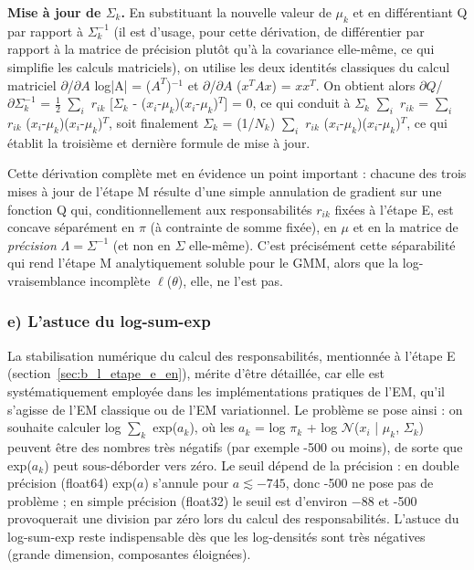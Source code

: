\textbf{Mise à jour de $\Sigma _{k}$. }En substituant la nouvelle valeur de $\mu _{k}$ et en différentiant Q par rapport à $\Sigma _{k}^{-1}$ (il est d'usage, pour cette dérivation, de différentier par rapport à la matrice de précision plutôt qu'à la covariance elle-même, ce qui simplifie les calculs matriciels), on utilise les deux identités classiques du calcul matriciel $\partial $/$\partial A$ log|A| = ($A^{T}$)$^{-1}$ et $\partial $/$\partial A$ ($x^{T}Ax$) = $xx^{T}$. On obtient alors $\partial Q$/$\partial \Sigma _{k}^{-1}$ = $\tfrac{1}{2}$ $\sum_{i}$ $r_{ik}$ [$\Sigma _{k}$ - ($x_{i}$-$\mu _{k}$)($x_{i}$-$\mu _{k}$)$^{T}$] = 0, ce qui conduit à $\Sigma _{k}$ $\sum_{i}$ $r_{ik}$ = $\sum_{i}$ $r_{ik}$ ($x_{i}$-$\mu _{k}$)($x_{i}$-$\mu _{k}$)$^{T}$, soit finalement $\Sigma _{k}$ = (1/$N_{k}$) $\sum_{i}$ $r_{ik}$ ($x_{i}$-$\mu _{k}$)($x_{i}$-$\mu _{k}$)$^{T}$, ce qui établit la troisième et dernière formule de mise à jour.

Cette dérivation complète met en évidence un point important : chacune des trois mises à jour de l'étape M résulte d'une simple annulation de gradient sur une fonction Q qui, conditionnellement aux responsabilités $r_{ik}$ fixées à l'étape E, est concave séparément en $\pi$ (à contrainte de somme fixée), en $\mu$ et en la matrice de \emph{précision} $\Lambda = \Sigma^{-1}$ (et non en $\Sigma$ elle-même). C'est précisément cette séparabilité qui rend l'étape M analytiquement soluble pour le GMM, alors que la log-vraisemblance incomplète $\ell $($\theta $), elle, ne l'est pas.

\subsubsection{e) L'astuce du log-sum-exp}\label{sec:e_l_astuce_du_log}
La stabilisation numérique du calcul des responsabilités, mentionnée à l'étape E (section~\ref{sec:b_l_etape_e_en}), mérite d'être détaillée, car elle est systématiquement employée dans les implémentations pratiques de l'EM, qu'il s'agisse de l'EM classique ou de l'EM variationnel. Le problème se pose ainsi : on souhaite calculer log $\sum_{k}$ exp($a_{k}$), où les $a_{k}$ = log $\pi _{k}$ + log $\mathcal{N}$($x_{i}$ | $\mu _{k}$, $\Sigma _{k}$) peuvent être des nombres très négatifs (par exemple -500 ou moins), de sorte que exp($a_{k}$) peut sous-déborder vers zéro. Le seuil dépend de la précision : en double précision (float64) exp($a$) s'annule pour $a \lesssim -745$, donc -500 ne pose pas de problème ; en simple précision (float32) le seuil est d'environ $-88$ et -500 provoquerait une division par zéro lors du calcul des responsabilités. L'astuce du log-sum-exp reste indispensable dès que les log-densités sont très négatives (grande dimension, composantes éloignées).

